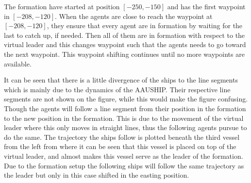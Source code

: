 \documentclass[a4paper,conference]{IEEEtran}
\begin{document}
The formation have started at position $[-250,-150]$ and has the first waypoint in $[-208,-120]$. When the agents are close to reach the waypoint at $[-208,-120]$, they ensure that every agent are in formation by waiting for the last to catch up, if needed. Then all of them are in formation with respect to the virtual leader and this changes waypoint such that the agents needs to go toward the next waypoint. This waypoint shifting continues until no more waypoints are available.

It can be seen that there is a little divergence of the ships to the line segments which is mainly due to the dynamics of the AAUSHIP. Their respective line segments are not shown on the figure, while this would make the figure confusing. Though the agents will follow a line segment from their position in the formation to the new position in the formation. This is due to the movement of the virtual leader where this only moves in straight lines, thus the following agents pursue to do the same. The trajectory the ships follow is plotted beneath the third vessel from the left from where it can be seen that this vessel is placed on top of the virtual leader, and almost makes this vessel serve as the leader of the formation. Due to the formation setup the following ships will follow the same trajectory as the leader but only in this case shifted in the easting position.
\end{document}
